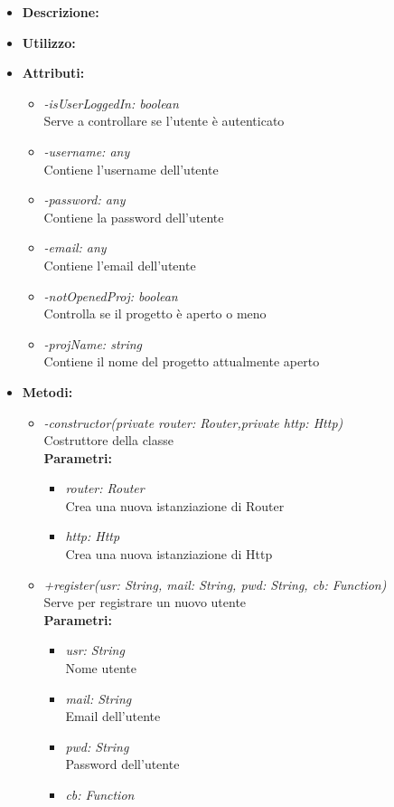 \begin{itemize}
	\item \textbf{Descrizione:}\\
	
	\item \textbf{Utilizzo:}\\
	
	\item \textbf{Attributi:}
		\begin{itemize}
			\item \emph{-isUserLoggedIn: boolean}\\
			Serve a controllare se l'utente è autenticato
			\item \emph{-username: any}\\
			Contiene l'username dell'utente
			\item \emph{-password: any}\\
			Contiene la password dell'utente
			\item \emph{-email: any}\\
			Contiene l'email dell'utente
			\item \emph{-notOpenedProj: boolean}\\
			Controlla se il progetto è aperto o meno
			\item \emph{-projName: string}\\
			Contiene il nome del progetto attualmente aperto
		\end{itemize}
	\item \textbf{Metodi:}
		\begin{itemize}
			\item \emph{-constructor(private router: Router,private http: Http)}\\
    		Costruttore della classe\\
    		\textbf{Parametri:}
    		\begin{itemize}
    			\item \emph{router: Router}\\
    			Crea una nuova istanziazione di Router
    			\item \emph{http: Http}\\
    			Crea una nuova istanziazione di Http
    		\end{itemize}
    		\item \emph{+register(usr: String, mail: String, pwd: String, cb: Function)}\\
    		Serve per registrare un nuovo utente\\
    		\textbf{Parametri:}
    		\begin{itemize}
    			\item \emph{usr: String}\\
    			Nome utente
    			\item \emph{mail: String}\\
    			Email dell'utente
    			\item \emph{pwd: String}\\
    			Password dell'utente
    			\item \emph{cb: Function}\\
    			

\end{itemize}
\end{itemize}
\end{itemize}
